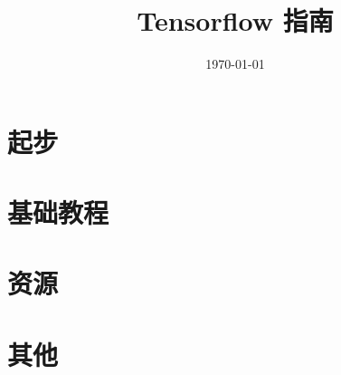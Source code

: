 \documentclass[a4paper,11pt,twoside]{ctexbook}
\title{Tensorflow 指南}
\author{}
\date{\today}
\begin{document}
\maketitle
\tableofcontents

\newpage
\chapter{起步}




\newpage
\chapter{基础教程}







\newpage



\newpage
\chapter{资源}

\newpage
\chapter{其他}
\end{document}
